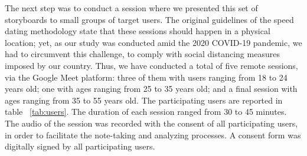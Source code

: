 The next step was to conduct a session where we presented this set of storyboards to small groups of target users. The original guidelines of the speed dating methodology state that these sessions should happen in a physical location; yet, as our study was conducted amid the 2020 COVID-19 pandemic, we had to circumvent this challenge, to comply with social distancing measures imposed by our country. Thus, we have conducted a total of five remote sessions, via the Google Meet platform: three of them with users ranging from 18 to 24 years old; one with ages ranging from 25 to 35 years old; and a final session with ages ranging from 35 to 55 years old. The participating users are reported in table ~\ref{tab:users}. The duration of each session ranged from 30 to 45 minutes. The audio of the session was recorded with the consent of all participating users, in order to facilitate the note-taking and analyzing processes. A consent form was digitally signed by all participating users.

